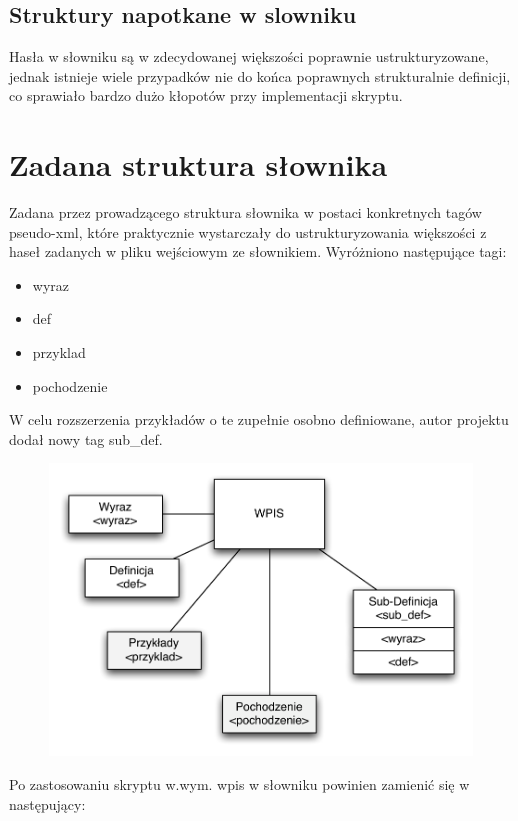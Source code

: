 \documentclass[12pt]{article}
\begin{document}
\subsection{Struktury napotkane w slowniku}
Hasła w słowniku są w zdecydowanej większości poprawnie ustrukturyzowane, jednak
istnieje wiele przypadków nie do końca poprawnych strukturalnie definicji, co 
sprawiało bardzo dużo kłopotów przy implementacji skryptu.

\section{Zadana struktura słownika}
Zadana przez prowadzącego struktura słownika w postaci konkretnych tagów pseudo-xml,
które praktycznie wystarczały do ustrukturyzowania większości z haseł zadanych w pliku
wejściowym ze słownikiem. Wyróżniono następujące tagi:

\begin{itemize}
  \item wyraz
  \item def
  \item przyklad
  \item pochodzenie
\end{itemize}

W celu rozszerzenia przykładów o te zupełnie osobno definiowane, autor projektu dodał
nowy tag sub\_def.\\

\begin{figure}[h]
  \centerline{
    \includegraphics[scale=0.75]{images/structure.pdf}
  }
\end{figure}


Po zastosowaniu skryptu w.wym. wpis w słowniku powinien zamienić się w następujący:
\end{document}
